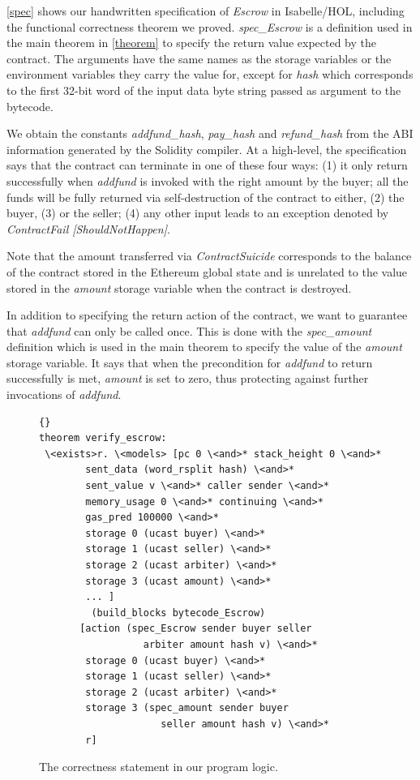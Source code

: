 \documentclass[sigplan,10pt]{acmart}\settopmatter{printfolios=true,printccs=false,printacmref=false}
\begin{document}
\autoref{spec} shows our handwritten specification of \textit{Escrow} in Isabelle/HOL,
including the functional correctness theorem we proved.
\textit{spec\_Escrow} is a definition used in the main theorem in \autoref{theorem} to specify
the return value expected by the contract.
The arguments have the same names as the storage variables or the environment
variables they carry the value for, except for \textit{hash} which corresponds
to the first 32-bit word of the input data byte string passed as argument
to the bytecode.

We obtain the constants \textit{addfund\_hash}, \textit{pay\_hash} and
\textit{refund\_hash} from the ABI information generated by the Solidity compiler.
At a high-level, the specification says that the contract can
terminate in one of these four ways:
(1) it only return successfully when \textit{addfund}
is invoked with the right amount by the buyer;
all the funds will be fully returned via self-destruction of
the contract to either, (2) the buyer,
(3) or the seller;
(4) any other input leads to an exception denoted by \textit{ContractFail [ShouldNotHappen]}.

Note that the amount transferred via \textit{ContractSuicide} corresponds
to the balance of the contract stored in the Ethereum global state and
is unrelated to the value stored in the \textit{amount} storage variable
when the contract is destroyed.

In addition to specifying the return action of the contract, we want
to guarantee that \textit{addfund} can only be called once.
This is done with the \textit{spec\_amount} definition which
is used in the main theorem to specify the value of the
\textit{amount} storage variable.
It says that when the precondition for \textit{addfund} to
return successfully is met, \textit{amount} is set to zero,
thus protecting against further invocations of \textit{addfund}.

\begin{figure}[h]
\begin{lstlisting}[language=Isar]{}
theorem verify_escrow:
 \<exists>r. \<models> [pc 0 \<and>* stack_height 0 \<and>*
        sent_data (word_rsplit hash) \<and>*
        sent_value v \<and>* caller sender \<and>*
        memory_usage 0 \<and>* continuing \<and>*
        gas_pred 100000 \<and>* 
        storage 0 (ucast buyer) \<and>*
        storage 1 (ucast seller) \<and>*
        storage 2 (ucast arbiter) \<and>*
        storage 3 (ucast amount) \<and>*
        ... ]
         (build_blocks bytecode_Escrow)
       [action (spec_Escrow sender buyer seller
                  arbiter amount hash v) \<and>*
        storage 0 (ucast buyer) \<and>*
        storage 1 (ucast seller) \<and>*
        storage 2 (ucast arbiter) \<and>*
        storage 3 (spec_amount sender buyer
                     seller amount hash v) \<and>*
        r]
\end{lstlisting}
\caption{The correctness statement in our program logic.}  
\label{theorem}
\end{figure}
\end{document}
